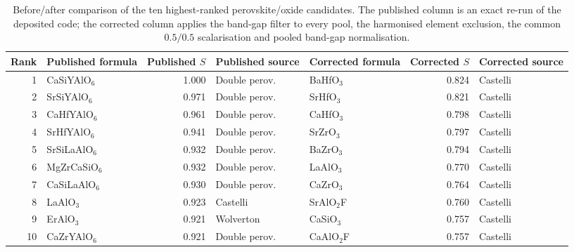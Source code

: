 \begin{table}[htbp]
\centering
\scriptsize
\setlength{\tabcolsep}{3pt}
\caption{Before/after comparison of the ten highest-ranked perovskite/oxide candidates. The published column is an exact re-run of the deposited code; the corrected column applies the band-gap filter to every pool, the harmonised element exclusion, the common $0.5/0.5$ scalarisation and pooled band-gap normalisation.}
\label{tab:a1_before_after}
\begin{tabular}{rlrllrl}
\toprule
Rank & Published formula & Published $S$ & Published source & Corrected formula & Corrected $S$ & Corrected source \\
\midrule
1 & CaSiYAlO$_{6}$ & 1.000 & Double perov. & BaHfO$_{3}$ & 0.824 & Castelli \\
2 & SrSiYAlO$_{6}$ & 0.971 & Double perov. & SrHfO$_{3}$ & 0.821 & Castelli \\
3 & CaHfYAlO$_{6}$ & 0.961 & Double perov. & CaHfO$_{3}$ & 0.798 & Castelli \\
4 & SrHfYAlO$_{6}$ & 0.941 & Double perov. & SrZrO$_{3}$ & 0.797 & Castelli \\
5 & SrSiLaAlO$_{6}$ & 0.932 & Double perov. & BaZrO$_{3}$ & 0.794 & Castelli \\
6 & MgZrCaSiO$_{6}$ & 0.932 & Double perov. & LaAlO$_{3}$ & 0.770 & Castelli \\
7 & CaSiLaAlO$_{6}$ & 0.930 & Double perov. & CaZrO$_{3}$ & 0.764 & Castelli \\
8 & LaAlO$_{3}$ & 0.923 & Castelli & SrAlO$_{2}$F & 0.760 & Castelli \\
9 & ErAlO$_{3}$ & 0.921 & Wolverton & CaSiO$_{3}$ & 0.757 & Castelli \\
10 & CaZrYAlO$_{6}$ & 0.921 & Double perov. & CaAlO$_{2}$F & 0.757 & Castelli \\
\bottomrule
\end{tabular}
\end{table}

